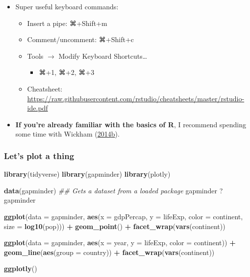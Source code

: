 \documentclass[
]{article}
\newenvironment{Shaded}{\begin{snugshade}}{\end{snugshade}}
\newcommand{\CommentTok}[1]{\textcolor[rgb]{0.56,0.35,0.01}{\textit{#1}}}
\newcommand{\DataTypeTok}[1]{\textcolor[rgb]{0.13,0.29,0.53}{#1}}
\newcommand{\KeywordTok}[1]{\textcolor[rgb]{0.13,0.29,0.53}{\textbf{#1}}}
\newcommand{\NormalTok}[1]{#1}
\newcommand{\OperatorTok}[1]{\textcolor[rgb]{0.81,0.36,0.00}{\textbf{#1}}}
\newcommand{\StringTok}[1]{\textcolor[rgb]{0.31,0.60,0.02}{#1}}
\providecommand{\tightlist}{%
  \setlength{\itemsep}{0pt}\setlength{\parskip}{0pt}}
\begin{document}
\begin{itemize}
\tightlist
\item
  Super useful keyboard commands:

  \begin{itemize}
  \tightlist
  \item
    Insert a pipe: ⌘+Shift+m
  \item
    Comment/uncomment: ⌘+Shift+c
  \item
    Tools \(\to\) Modify Keyboard Shortcuts\ldots{}

    \begin{itemize}
    \tightlist
    \item
      ⌘+1, ⌘+2, ⌘+3
    \end{itemize}
  \item
    Cheatsheet: \url{https://raw.githubusercontent.com/rstudio/cheatsheets/master/rstudio-ide.pdf}
  \end{itemize}
\item
  \textbf{If you're already familiar with the basics of R}, I recommend spending some time with Wickham (\protect\hyperlink{ref-WickhamAdvanced2014}{2014}\protect\hyperlink{ref-WickhamAdvanced2014}{b}).
\end{itemize}

\hypertarget{lets-plot-a-thing}{%
\subsubsection{Let's plot a thing}\label{lets-plot-a-thing}}

\begin{Shaded}
\begin{Highlighting}[]
\KeywordTok{library}\NormalTok{(tidyverse)}
\KeywordTok{library}\NormalTok{(gapminder)}
\KeywordTok{library}\NormalTok{(plotly)}

\KeywordTok{data}\NormalTok{(gapminder) }\CommentTok{\#\# Gets a dataset from a loaded package}
\NormalTok{gapminder}
\NormalTok{?gapminder}

\KeywordTok{ggplot}\NormalTok{(}\DataTypeTok{data =}\NormalTok{ gapminder, }\KeywordTok{aes}\NormalTok{(}\DataTypeTok{x =}\NormalTok{ gdpPercap, }\DataTypeTok{y =}\NormalTok{ lifeExp, }\DataTypeTok{color =}\NormalTok{ continent, }
                             \DataTypeTok{size =} \KeywordTok{log10}\NormalTok{(pop))) }\OperatorTok{+}
\StringTok{  }\KeywordTok{geom\_point}\NormalTok{() }\OperatorTok{+}
\StringTok{  }\KeywordTok{facet\_wrap}\NormalTok{(}\KeywordTok{vars}\NormalTok{(continent))}

\KeywordTok{ggplot}\NormalTok{(}\DataTypeTok{data =}\NormalTok{ gapminder, }\KeywordTok{aes}\NormalTok{(}\DataTypeTok{x =}\NormalTok{ year, }\DataTypeTok{y =}\NormalTok{ lifeExp, }\DataTypeTok{color =}\NormalTok{ continent)) }\OperatorTok{+}
\StringTok{  }\KeywordTok{geom\_line}\NormalTok{(}\KeywordTok{aes}\NormalTok{(}\DataTypeTok{group =}\NormalTok{ country)) }\OperatorTok{+}
\StringTok{  }\KeywordTok{facet\_wrap}\NormalTok{(}\KeywordTok{vars}\NormalTok{(continent))}

\KeywordTok{ggplotly}\NormalTok{()}
\end{Highlighting}
\end{Shaded}
\end{document}
